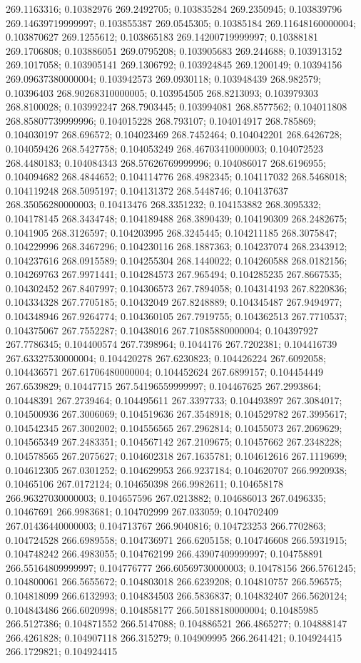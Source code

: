 269.1163316; 0.10382976 269.2492705; 0.103835284 269.2350945; 0.103839796 269.14639719999997; 0.103855387 269.0545305; 0.10385184 269.11648160000004; 0.103870627 269.1255612; 0.103865183 269.14200719999997; 0.10388181 269.1706808; 0.103886051 269.0795208; 0.103905683 269.244688; 0.103913152 269.1017058; 0.103905141 269.1306792; 0.103924845 269.1200149; 0.10394156 269.09637380000004; 0.103942573 269.0930118; 0.103948439 268.982579; 0.10396403 268.90268310000005; 0.103954505 268.8213093; 0.103979303 268.8100028; 0.103992247 268.7903445; 0.103994081 268.8577562; 0.104011808 268.85807739999996; 0.104015228 268.793107; 0.104014917 268.785869; 0.104030197 268.696572; 0.104023469 268.7452464; 0.104042201 268.6426728; 0.104059426 268.5427758; 0.104053249 268.46703410000003; 0.104072523 268.4480183; 0.104084343 268.57626769999996; 0.104086017 268.6196955; 0.104094682 268.4844652; 0.104114776 268.4982345; 0.104117032 268.5468018; 0.104119248 268.5095197; 0.104131372 268.5448746; 0.104137637 268.35056280000003; 0.10413476 268.3351232; 0.104153882 268.3095332; 0.104178145 268.3434748; 0.104189488 268.3890439; 0.104190309 268.2482675; 0.1041905 268.3126597; 0.104203995 268.3245445; 0.104211185 268.3075847; 0.104229996 268.3467296; 0.104230116 268.1887363; 0.104237074 268.2343912; 0.104237616 268.0915589; 0.104255304 268.1440022; 0.104260588 268.0182156; 0.104269763 267.9971441; 0.104284573 267.965494; 0.104285235 267.8667535; 0.104302452 267.8407997; 0.104306573 267.7894058; 0.104314193 267.8220836; 0.104334328 267.7705185; 0.10432049 267.8248889; 0.104345487 267.9494977; 0.104348946 267.9264774; 0.104360105 267.7919755; 0.104362513 267.7710537; 0.104375067 267.7552287; 0.10438016 267.71085880000004; 0.104397927 267.7786345; 0.104400574 267.7398964; 0.1044176 267.7202381; 0.104416739 267.63327530000004; 0.104420278 267.6230823; 0.104426224 267.6092058; 0.104436571 267.61706480000004; 0.104452624 267.6899157; 0.104454449 267.6539829; 0.10447715 267.54196559999997; 0.104467625 267.2993864; 0.10448391 267.2739464; 0.104495611 267.3397733; 0.104493897 267.3084017; 0.104500936 267.3006069; 0.104519636 267.3548918; 0.104529782 267.3995617; 0.104542345 267.3002002; 0.104556565 267.2962814; 0.10455073 267.2069629; 0.104565349 267.2483351; 0.104567142 267.2109675; 0.10457662 267.2348228; 0.104578565 267.2075627; 0.104602318 267.1635781; 0.104612616 267.1119699; 0.104612305 267.0301252; 0.104629953 266.9237184; 0.104620707 266.9920938; 0.10465106 267.0172124; 0.104650398 266.9982611; 0.104658178 266.96327030000003; 0.104657596 267.0213882; 0.104686013 267.0496335; 0.10467691 266.9983681; 0.104702999 267.033059; 0.104702409 267.01436440000003; 0.104713767 266.9040816; 0.104723253 266.7702863; 0.104724528 266.6989558; 0.104736971 266.6205158; 0.104746608 266.5931915; 0.104748242 266.4983055; 0.104762199 266.43907409999997; 0.104758891 266.55164809999997; 0.104776777 266.60569730000003; 0.10478156 266.5761245; 0.104800061 266.5655672; 0.104803018 266.6239208; 0.104810757 266.596575; 0.104818099 266.6132993; 0.104834503 266.5836837; 0.104832407 266.5620124; 0.104843486 266.6020998; 0.104858177 266.50188180000004; 0.10485985 266.5127386; 0.104871552 266.5147088; 0.104886521 266.4865277; 0.104888147 266.4261828; 0.104907118 266.315279; 0.104909995 266.2641421; 0.104924415 266.1729821; 0.104924415 